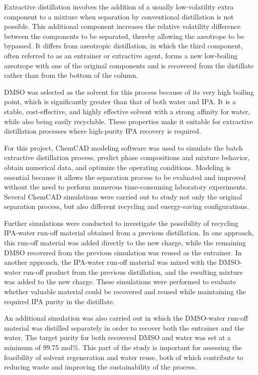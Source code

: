 Extractive distillation involves the addition of a usually
low-volatility extra component to a mixture when separation by
conventional distillation is not possible. This additional component
increases the relative volatility difference between the components to
be separated, thereby allowing the azeotrope to be bypassed. It differs
from azeotropic distillation, in which the third component, often
referred to as an entrainer or extractive agent, forms a new low-boiling
azeotrope with one of the original components and is recovered from the
distillate rather than from the bottom of the column.

DMSO was selected as the solvent for this process because of its very
high boiling point, which is significantly greater than that of both
water and IPA. It is a stable, cost-effective, and highly effective
solvent with a strong affinity for water, while also being easily
recyclable. These properties make it suitable for extractive
distillation processes where high-purity IPA recovery is required.

For this project, ChemCAD modeling software was used to simulate the
batch extractive distillation process, predict phase compositions and
mixture behavior, obtain numerical data, and optimize the operating
conditions. Modeling is essential because it allows the separation
process to be evaluated and improved without the need to perform
numerous time-consuming laboratory experiments. Several ChemCAD
simulations were carried out to study not only the original separation
process, but also different recycling and energy-saving configurations.

Further simulations were conducted to investigate the possibility of
recycling IPA-water run-off material obtained from a previous
distillation. In one approach, this run-off material was added directly
to the new charge, while the remaining DMSO recovered from the previous
simulation was reused as the entrainer. In another approach, the
IPA-water run-off material was mixed with the DMSO-water run-off product
from the previous distillation, and the resulting mixture was added to
the new charge. These simulations were performed to evaluate whether
valuable material could be recovered and reused while maintaining the
required IPA purity in the distillate.

An additional simulation was also carried out in which the DMSO-water
run-off material was distilled separately in order to recover both the
entrainer and the water. The target purity for both recovered DMSO and
water was set at a minimum of 99.75 mol\%. This part of the study is
important for assessing the feasibility of solvent regeneration and
water reuse, both of which contribute to reducing waste and improving
the sustainability of the process.

